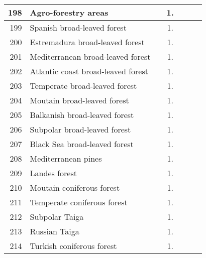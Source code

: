 {{\begin{tabular}{||r|l||c|c|c|c|c||}
         198  & Agro-forestry areas                                          &       &  1.   &       &       \\
 \hline
 \hline
         199  & Spanish broad-leaved forest                                  &       &  1.   &       &       \\
 \hline
         200  & Estremadura broad-leaved forest                              &       &  1.   &       &       \\
 \hline
         201  & Mediterranean broad-leaved forest                            &       &  1.   &       &       \\
 \hline
         202  & Atlantic coast broad-leaved forest                           &       &  1.   &       &       \\
 \hline
         203  & Temperate broad-leaved forest                                &       &  1.   &       &       \\
 \hline
         204  & Moutain broad-leaved forest                                  &       &  1.   &       &       \\
 \hline
         205  & Balkanish broad-leaved forest                                &       &  1.   &       &       \\
 \hline
         206  & Subpolar broad-leaved forest                                 &       &  1.   &       &       \\
 \hline
         207  & Black Sea broad-leaved forest                                &       &  1.   &       &       \\
 \hline
 \hline
         208  & Mediterranean pines                                          &       &  1.   &       &       \\
 \hline
         209  & Landes forest                                                &       &  1.   &       &       \\
 \hline
         210  & Moutain coniferous forest                                    &       &  1.   &       &       \\
 \hline
         211  & Temperate coniferous forest                                  &       &  1.   &       &       \\
 \hline
         212  & Subpolar Taiga                                               &       &  1.   &       &       \\
 \hline
         213  & Russian Taiga                                                &       &  1.   &       &       \\
 \hline
         214  & Turkish coniferous forest                                    &       &  1.   &       &       \\

\end{tabular}}}
